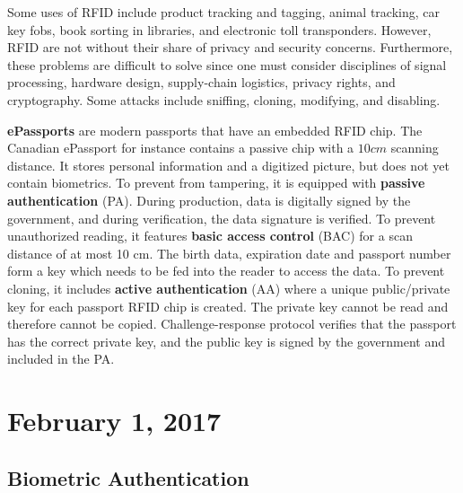 \documentclass[11pt]{article}
\theoremstyle{plain} %
\theoremstyle{definition}
\theoremstyle{example}
\theoremstyle{remark}
\begin{document}
Some uses of RFID include product tracking and tagging, animal tracking, car key fobs, book sorting in libraries, and electronic toll transponders. However, RFID are not without their share of privacy and security concerns. Furthermore, these problems are difficult to solve since one must consider disciplines of signal processing, hardware design, supply-chain logistics, privacy rights, and cryptography. Some attacks include sniffing, cloning, modifying, and disabling. 

\textbf{ePassports} are modern passports that have an embedded RFID chip. The Canadian ePassport for instance contains a passive chip with a $10cm$ scanning distance. It stores personal information and a digitized picture, but does not yet contain biometrics. To prevent from tampering, it is equipped with \textbf{passive authentication} (PA). During production, data is digitally signed by the government, and during verification, the data signature is verified. To prevent unauthorized reading, it features \textbf{basic access control} (BAC) for a scan distance of at most 10 cm. The birth data, expiration date and passport number form a key which needs to be fed into the reader to access the data. To prevent cloning, it includes \textbf{active authentication} (AA)
where a unique public/private key for each passport RFID chip is created. The private key cannot be read and therefore cannot be copied. Challenge-response protocol verifies that the passport has the correct private key, and the public key is signed by the government and included in the PA. 

\section{February 1, 2017}
\subsection{Biometric Authentication}
\end{document}
